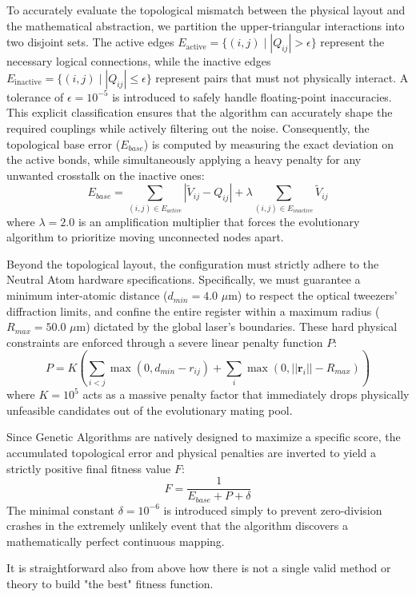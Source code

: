 To accurately evaluate the topological mismatch between the physical layout and the mathematical abstraction, we partition the upper-triangular interactions into two disjoint sets. The active edges $E_{\text{active}} = \{(i,j) \mid |Q_{ij}| > \epsilon\}$ represent the necessary logical connections, while the inactive edges $E_{\text{inactive}} = \{(i,j) \mid |Q_{ij}| \le \epsilon\}$ represent pairs that must not physically interact. A tolerance of $\epsilon = 10^{-5}$ is introduced to safely handle floating-point inaccuracies. This explicit classification ensures that the algorithm can accurately shape the required couplings while actively filtering out the noise.
Consequently, the topological base error ($E_{base}$) is computed by measuring the exact deviation on the active bonds, while simultaneously applying a heavy penalty for any unwanted crosstalk on the inactive ones:
$$ E_{base} = \sum_{(i,j) \in E_{active}} \left| \tilde{V}_{ij} - Q_{ij} \right| + \lambda \sum_{(i,j) \in E_{inactive}} \tilde{V}_{ij} $$
where $\lambda = 2.0$ is an amplification multiplier that forces the evolutionary algorithm to prioritize moving unconnected nodes apart.

Beyond the topological layout, the configuration must strictly adhere to the Neutral Atom hardware specifications. Specifically, we must guarantee a minimum inter-atomic distance ($d_{min} = 4.0$ $\mu$m) to respect the optical tweezers' diffraction limits, and confine the entire register within a maximum radius ($R_{max} = 50.0$ $\mu$m) dictated by the global laser's boundaries. These hard physical constraints are enforced through a severe linear penalty function $P$:
$$ P = K \left( \sum_{i<j} \max(0, d_{min} - r_{ij}) + \sum_{i} \max(0, ||\mathbf{r}_i|| - R_{max}) \right) $$
where $K = 10^5$ acts as a massive penalty factor that immediately drops physically unfeasible candidates out of the evolutionary mating pool.

Since Genetic Algorithms are natively designed to maximize a specific score, the accumulated topological error and physical penalties are inverted to yield a strictly positive final fitness value $F$:
$$ F = \frac{1}{E_{base} + P + \delta} $$
The minimal constant $\delta = 10^{-6}$ is introduced simply to prevent zero-division crashes in the extremely unlikely event that the algorithm discovers a mathematically perfect continuous mapping.

It is straightforward also from above how there is not a single valid method or theory to build "the best" fitness function.


